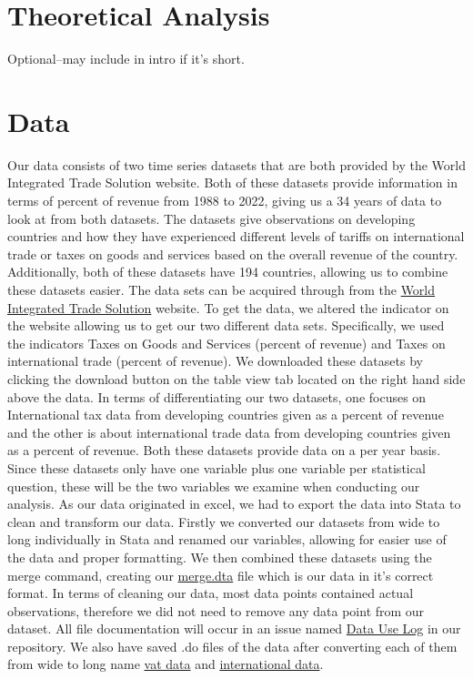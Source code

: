 \documentclass[12pt]{article}
\begin{document}
\section{Theoretical Analysis}
\label{sec:theory}
Optional--may include in intro if it's short.


\section{Data}
\label{sec:data}

Our data consists of two time series datasets that are both provided by the World Integrated Trade Solution website. Both of these datasets provide information in terms of percent of revenue from 1988 to 2022, giving us a 34 years of data to look at from both datasets. The datasets give observations on developing countries and how they have experienced different levels of tariffs on international trade or taxes on goods and services based on the overall revenue of the country. Additionally, both of these datasets have 194 countries, allowing us to combine these datasets easier. The data sets can be acquired through from the \href{https://wits.worldbank.org/CountryProfile/en/Country/BY-COUNTRY/StartYear/1988/EndYear/2022/Indicator/GC-TAX-GSRV-VA-ZS}{World Integrated Trade Solution}  website. To get the data, we altered the indicator on the website allowing us to get our two different data sets. Specifically, we used the indicators Taxes on Goods and Services (percent of revenue) and Taxes on international trade (percent of revenue). We downloaded these datasets by clicking the download button on the table view tab located on the right hand side above the data. In terms of differentiating our two datasets, one focuses on International tax data from developing countries given as a percent of revenue and the other is about international trade data from developing countries given as a percent of revenue. Both these datasets provide data on a per year basis. Since these datasets only have one variable plus one variable per statistical question, these will be the two variables we examine when conducting our analysis. As our data originated in excel, we had to export the data into Stata to clean and transform our data. Firstly we converted our datasets from wide to long individually in Stata and renamed our variables, allowing for easier use of the data and proper formatting. We then combined these datasets using the merge command, creating our \href{https://github.com/ecn310/course-project-taxes-tariffs/blob/main/merged.dta}{merge.dta} file which is our data in it's correct format. In terms of cleaning our data, most data points contained actual observations, therefore we did not need to remove any data point from our dataset. All file documentation will occur in an issue named \href{https://github.com/ecn310/course-project-taxes-tariffs/issues/6}{Data Use Log} in our repository. We also have saved .do files of the data after converting each of them from wide to long name \href{https://github.com/ecn310/course-project-taxes-tariffs/commit/cc891cfec48f11c6a0b9c1aeb2ae980147232ff4}{vat data} and \href{https://github.com/ecn310/course-project-taxes-tariffs/commit/cc891cfec48f11c6a0b9c1aeb2ae980147232ff4}{international data}. 
\end{document}
